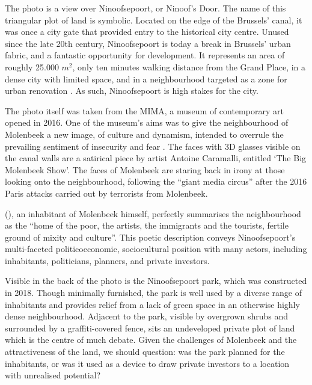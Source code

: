 \documentclass{article}[11pt]
\begin{document}
The photo is a view over Ninoofsepoort, or Ninoof's Door. The name of this triangular plot of land is symbolic. Located on the edge of the Brussels' canal, it was once a city gate that provided entry to the historical city centre. Unused since the late 20th century, Ninoofsepoort is today a break in Brussels' urban fabric, and a fantastic opportunity for development. It represents an area of roughly 25.000 $m^2$, only ten minutes walking distance from the Grand Place, in a dense city with limited space, and in a neighbourhood targeted as a zone for urban renovation \parencite{perspective2020zru}. As such, Ninoofsepoort is high stakes for the city.

The photo itself was taken from the MIMA, a museum of contemporary art opened in 2016. One of the museum's aims was to give the neighbourhood of Molenbeek a new image, of culture and dynamism, intended to overrule the prevailing sentiment of insecurity and fear \parencite{expatica2016molenbeek}. The faces with 3D glasses visible on the canal walls are a satirical piece by artist Antoine Caramalli, entitled `The Big Molenbeek Show'. The faces of Molenbeek are staring back in irony at those looking onto the neighbourhood, following the ``giant media circus''\parencite{antoine2016canal} after the 2016 Paris attacks carried out by terrorists from Molenbeek.

\citeauthor{antoine2016canal} (\citeyear{antoine2016canal}), an inhabitant of Molenbeek himself, perfectly summarises the neighbourhood as the ``home of the poor, the artists, the immigrants and the tourists, fertile ground of mixity and culture''.
This poetic description conveys Ninoofsepoort's multi-faceted politicoeconomic, sociocultural position with many actors, including inhabitants, politicians, planners, and private investors.

Visible in the back of the photo is the Ninoofsepoort park, which was constructed in 2018. Though minimally furnished, the park is well used by a diverse range of inhabitants and provides relief from a lack of green space in an otherwise highly dense neighbourhood.
Adjacent to the park, visible by overgrown shrubs and surrounded by a graffiti-covered fence, sits an undeveloped private plot of land which is the centre of much debate. 
Given the challenges of Molenbeek and the attractiveness of the land, we should question: was the park planned for the inhabitants, or was it used as a device to draw private investors to a location with unrealised potential?
\end{document}
